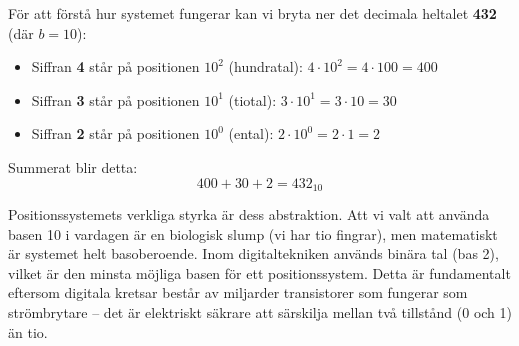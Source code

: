 \documentclass[
  swedish,
  letterpaper,
  oneside,
  openany]{book}
\providecommand{\tightlist}{%
  \setlength{\itemsep}{0pt}\setlength{\parskip}{0pt}}
\begin{document}
\begin{tcolorbox}[enhanced jigsaw, arc=.35mm, bottomrule=.15mm, bottomtitle=1mm, breakable, colback=white, colbacktitle=quarto-callout-note-color!10!white, colframe=quarto-callout-note-color-frame, coltitle=black, left=2mm, leftrule=.75mm, opacityback=0, opacitybacktitle=0.6, rightrule=.15mm, title=\textcolor{quarto-callout-note-color}{\faInfo}\hspace{0.5em}{Exempel: Positionssystemet för talet 432}, titlerule=0mm, toprule=.15mm, toptitle=1mm]

För att förstå hur systemet fungerar kan vi bryta ner det decimala
heltalet \textbf{432} (där \(b=10\)):

\begin{itemize}
\tightlist
\item
  Siffran \textbf{4} står på positionen \(10^2\) (hundratal):
  \(4 \cdot 10^2 = 4 \cdot 100 = 400\)
\item
  Siffran \textbf{3} står på positionen \(10^1\) (tiotal):
  \(3 \cdot 10^1 = 3 \cdot 10 = 30\)
\item
  Siffran \textbf{2} står på positionen \(10^0\) (ental):
  \(2 \cdot 10^0 = 2 \cdot 1 = 2\)
\end{itemize}

Summerat blir detta: \[400 + 30 + 2 = 432_{10}\]

\end{tcolorbox}

Positionssystemets verkliga styrka är dess abstraktion. Att vi valt att
använda basen 10 i vardagen är en biologisk slump (vi har tio fingrar),
men matematiskt är systemet helt basoberoende. Inom digitaltekniken
används binära tal (bas 2), vilket är den minsta möjliga basen för ett
positionssystem. Detta är fundamentalt eftersom digitala kretsar består
av miljarder transistorer som fungerar som strömbrytare -- det är
elektriskt säkrare att särskilja mellan två tillstånd (0 och 1) än tio.
\end{document}
